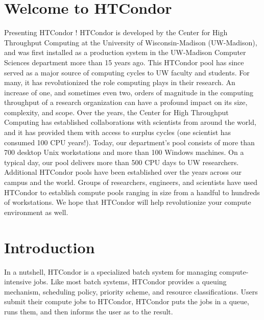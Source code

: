 \section{Welcome to HTCondor}  
%
% 
%

\label{sec:usermanual}
Presenting HTCondor \VersionNotice! HTCondor is developed by
the Center for High Throughput Computing at the University of Wisconsin-Madison (UW-Madison), and
was first installed as a production system in the UW-Madison Computer
Sciences department more than 15 years ago. This HTCondor pool has since
served as a major source of computing cycles to UW faculty and students.
For many, it has revolutionized the role computing plays in their
research. An increase of one, and sometimes even two, orders of
magnitude in the computing throughput of a research organization can
have a profound impact on its size, complexity, and scope. Over the
years, the Center for High Throughput Computing has established collaborations with scientists
from around the world, and it has provided them with access to surplus
cycles (one scientist has consumed 100 CPU years!). Today, our
department's pool consists of more than 700 desktop Unix workstations
and more than 100 Windows machines.
On a typical day, our pool delivers more than 500 CPU days to UW
researchers. Additional HTCondor pools have been established over the
years across our campus and the world. Groups of researchers, engineers,
and scientists have used HTCondor to establish compute pools ranging in
size from a handful to hundreds of workstations. We hope that HTCondor
will help revolutionize your compute environment as well.


\section{Introduction}


In a nutshell, HTCondor is a specialized batch system 
for managing compute-intensive jobs.
Like most batch systems, HTCondor provides a
queuing mechanism, scheduling policy, priority scheme, and resource
classifications.  Users submit their compute jobs to HTCondor, HTCondor puts
the jobs in a queue, runs them, and then informs the user as to the
result.

